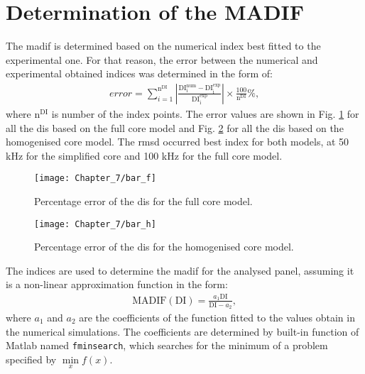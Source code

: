 \section{Determination of the MADIF}
\label{sec:determination}

The \ac{madif} is determined based on the numerical index best fitted to the experimental one. 
For that reason, the error between the numerical and experimental obtained indices was determined in the form of:
\begin{eqnarray}
	error = \sum_{i=1}^{\mathrm{n^{DI}}} \left|\frac{\mathrm{DI_i^{num}}-\mathrm{DI_i^{exp}}}{\mathrm{DI_i^{exp}}}\right|\times\frac{100}{\mathrm{n^{DI}}}\%,
\end{eqnarray}
where \(\mathrm{n^{DI}}\) is number of the index points.
The error values are shown in Fig. \ref{fig:bar_f} for all the \acp{di} based on the full core model and Fig. \ref{fig:bar_h} for all the \acp{di} based on the homogenised core model.
The \ac{rmsd} occurred best index for both models, at 50 kHz for the simplified core and 100 kHz for the full core model.
\begin{figure}[!tbh]
	\begin{center}
		\texttt{[image: Chapter\_7/bar\_f]}
	\end{center}
	\caption{Percentage error of the \acp{di} for the full core model.}
	\label{fig:bar_f}
\end{figure}
\begin{figure}[!tbh]
	\begin{center}
		\texttt{[image: Chapter\_7/bar\_h]}
	\end{center}
	\caption{Percentage error of the \acp{di} for the homogenised core model.}
	\label{fig:bar_h}
\end{figure}
The indices are used to determine the \ac{madif} for the analysed panel, assuming it is a non-linear approximation function in the form:
\begin{eqnarray}
	\mathrm{MADIF(DI)} = \frac{a_1\mathrm{DI}}{\mathrm{DI}-a_2},
	\label{eg:app_function} 
\end{eqnarray}
where \(a_1\) and \(a_2\) are the coefficients of the function fitted to the values obtain in the numerical simulations. The coefficients are determined by built-in function of Matlab named \verb+fminsearch+, which searches for the minimum of a problem specified by \(\min\limits_x f(x)\).
